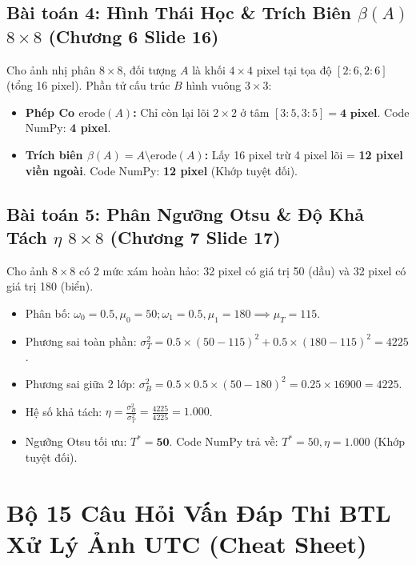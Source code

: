 \documentclass[11pt,a4paper]{article}
\begin{document}
\subsection{Bài toán 4: Hình Thái Học \& Trích Biên $\beta(A)$ $8 \times 8$ (Chương 6 Slide 16)}
Cho ảnh nhị phân $8 \times 8$, đối tượng $A$ là khối $4 \times 4$ pixel tại tọa độ $[2:6, 2:6]$ (tổng 16 pixel). Phần tử cấu trúc $B$ hình vuông $3 \times 3$:
\begin{itemize}
    \item \textbf{Phép Co $\text{erode}(A)$:} Chỉ còn lại lõi $2 \times 2$ ở tâm $[3:5, 3:5] = \mathbf{4\text{ pixel}}$. Code NumPy: \textbf{4 pixel}.
    \item \textbf{Trích biên $\beta(A) = A \setminus \text{erode}(A)$:} Lấy 16 pixel trừ 4 pixel lõi = \textbf{12 pixel viền ngoài}. Code NumPy: \textbf{12 pixel} (Khớp tuyệt đối).
\end{itemize}

\subsection{Bài toán 5: Phân Ngưỡng Otsu \& Độ Khả Tách $\eta$ $8 \times 8$ (Chương 7 Slide 17)}
Cho ảnh $8 \times 8$ có 2 mức xám hoàn hảo: 32 pixel có giá trị 50 (dầu) và 32 pixel có giá trị 180 (biển).
\begin{itemize}
    \item Phân bố: $\omega_0 = 0.5, \mu_0 = 50; \omega_1 = 0.5, \mu_1 = 180 \implies \mu_T = 115$.
    \item Phương sai toàn phần: $\sigma_T^2 = 0.5 \times (50-115)^2 + 0.5 \times (180-115)^2 = 4225$.
    \item Phương sai giữa 2 lớp: $\sigma_B^2 = 0.5 \times 0.5 \times (50 - 180)^2 = 0.25 \times 16900 = 4225$.
    \item Hệ số khả tách: $\eta = \frac{\sigma_B^2}{\sigma_T^2} = \frac{4225}{4225} = \mathbf{1.000}$.
    \item Ngưỡng Otsu tối ưu: $T^* = \mathbf{50}$. Code NumPy trả về: $T^* = 50, \eta = 1.000$ (Khớp tuyệt đối).
\end{itemize}

\newpage

\section{Bộ 15 Câu Hỏi Vấn Đáp Thi BTL Xử Lý Ảnh UTC (Cheat Sheet)}
\end{document}
